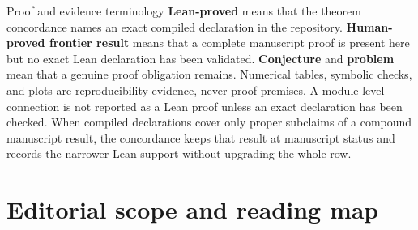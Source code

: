 \begin{abstract}
\sloppy
This volume unifies two sampling geometries for the Fabius--Rvachev system.
Its additive dyadic comb yields exact generating functions for each row,
Bell--Prouhet compression, terminating
Euler--Maclaurin formulae, phase-sensitive Rvachev cubature, and sharp global
interpolation instability with stable local alternatives.  On the geometric
comb $cq^{\NaturalNumbers}$ it develops Gaussian-Pascal and Jackson--Newton
calculus, exact residual and stability formulae, Mellin and regular-variation
filters, geometric-knot splines, inverse-dyadic Fabius transforms, and finite
Rvachev synthesis.  The common algebra explains why Gaussian binomials,
Bernoulli and Bell polynomials, Thue--Morse cancellation, Richardson
extrapolation, Lambert $W$, and the Rvachev sinc product repeatedly meet in the
same problem.

The text consolidates four live manuscripts and, through the additive-dyadic
manuscript, nine earlier source packages.  Repeated geometric-comb derivations
are stated once in their strongest form.  Independent extensions are retained
with their own proofs.  Every theorem, proposition, lemma, and corollary in
this volume has an explicit human-readable proof; every unproved mathematical
claim is visibly labelled as a conjecture, problem, or research question.
\end{abstract}

\begin{statusbox}{Proof and evidence terminology}
\textbf{Lean-proved} means that the theorem concordance names an exact compiled
declaration in the repository.  \textbf{Human-proved frontier result} means
that a complete manuscript proof is present here but no exact Lean declaration
has been validated.  \textbf{Conjecture} and \textbf{problem} mean that a
genuine proof obligation remains.  Numerical tables, symbolic checks, and
plots are reproducibility evidence, never proof premises.  A module-level
connection is not reported as a Lean proof unless an exact declaration has
been checked.  When compiled declarations cover only proper subclaims of a
compound manuscript result, the concordance keeps that result at manuscript
status and records the narrower Lean support without upgrading the whole row.
\end{statusbox}

\section*{Editorial scope and reading map}

